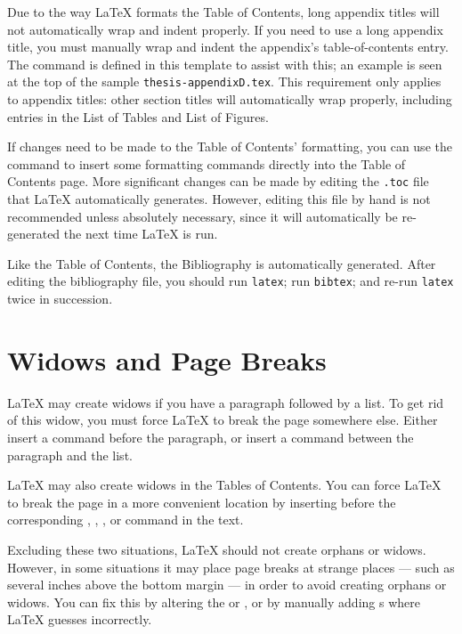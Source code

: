 Due to the way \LaTeX{} formats the Table of Contents, long appendix titles
will not automatically wrap and indent properly.  If you need to use a long
appendix title, you must manually wrap and indent the appendix's
table-of-contents entry.  The  command is defined in this
template to assist with this; an example is seen at the top of the sample
\texttt{thesis-appendixD.tex}.  This requirement only applies to appendix
titles: other section titles will automatically wrap properly, including
entries in the List of Tables and List of Figures.

If changes need to be made to the Table of Contents' formatting, you can use
the  command to insert some formatting commands
directly into the Table of Contents page.  More significant changes can be made
by editing the \texttt{.toc} file that \LaTeX{} automatically generates.
However, editing this file by hand is not recommended unless absolutely
necessary, since it will automatically be re-generated the next time \LaTeX{}
is run.

Like the Table of Contents, the Bibliography is automatically generated.  After
editing the bibliography file, you should run \texttt{latex}; run
\texttt{bibtex}; and re-run \texttt{latex} twice in succession.

\section{Widows and Page Breaks}

\LaTeX{} may create widows if you have a paragraph followed by a list.  To get
rid of this widow, you must force \LaTeX{} to break the page somewhere else.
Either insert a  command before the paragraph, or insert a
 command between the paragraph and the list.

\LaTeX{} may also create widows in the Tables of Contents.  You can force
\LaTeX{} to break the page in a more convenient location by inserting
 before the corresponding
, , , or  command
in the text.

Excluding these two situations, \LaTeX{} should not create orphans or widows.
However, in some situations it may place page breaks at strange places --- such
as several inches above the bottom margin --- in order to avoid creating
orphans or widows.  You can fix this by altering the  or
, or by manually adding s where \LaTeX{} guesses
incorrectly.
